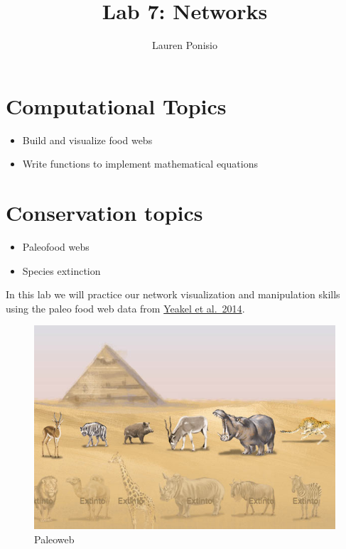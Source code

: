 \documentclass[
]{article}
\title{Lab 7: Networks}
\author{Lauren Ponisio}
\date{}
\providecommand{\tightlist}{%
  \setlength{\itemsep}{0pt}\setlength{\parskip}{0pt}}
\begin{document}
\maketitle

\section{Computational Topics}\label{computational-topics}

\begin{itemize}
\tightlist
\item
  Build and visualize food webs
\item
  Write functions to implement mathematical equations
\end{itemize}

\section{Conservation topics}\label{conservation-topics}

\begin{itemize}
\tightlist
\item
  Paleofood webs
\item
  Species extinction
\end{itemize}

In this lab we will practice our network visualization and manipulation
skills using the paleo food web data from
\href{https://doi.org/10.1073/pnas.1408471111}{Yeakel et al.~2014}.

\begin{figure}
\centering
\includegraphics{figures/paleoweb.jpg}
\caption{Paleoweb}
\end{figure}
\end{document}
